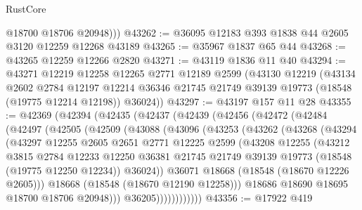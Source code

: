 \begin{lexlean}{RustCore}
\begin{coremodule}
          @18700
          @18706
          @20948)))
@43262 := @36095 @12183 @393 @1838 @44 @2605 @3120 @12259 @12268 @43189
@43265 := @35967 @1837 @65 @44
@43268 := @43265 @12259 @12266 @2820
@43271 := @43119 @1836 @11 @40
@43294 := @43271
    @12219
    @12258
    @12265
    @2771
    @12189
    @2599
    (@43130
      @12219
      (@43134
        @2602
        @2784
        @12197
        @12214
        @36346
        @21745
        @21749
        @39139
        @19773
        (@18548 (@19775 @12214 @12198))
        @36024))
@43297 := @43197 @157 @11 @28
@43355 := @42369
    (@42394
      (@42435
        (@42437
          (@42439
            (@42456
              (@42472
                (@42484
                  (@42497
                    (@42505
                      (@42509
                        (@43088
                          (@43096
                            (@43253
                              (@43262
                                (@43268
                                  (@43294
                                    (@43297
                                      @12255
                                      @2605
                                      @2651
                                      @2771
                                      @12225
                                      @2599
                                      (@43208
                                        @12255
                                        (@43212
                                          @3815
                                          @2784
                                          @12233
                                          @12250
                                          @36381
                                          @21745
                                          @21749
                                          @39139
                                          @19773
                                          (@18548 (@19775 @12250 @12234))
                                          @36024))
                                      @36071
                                      @18668
                                      (@18548 (@18670 @12226 @2605)))
                                    @18668
                                    (@18548 (@18670 @12190 @12258)))
                                  @18686
                                  @18690
                                  @18695
                                  @18700
                                  @18706
                                  @20948)))
                            @36205))))))))))))
@43356 := @17922 @419

\end{coremodule}
\end{lexlean}
